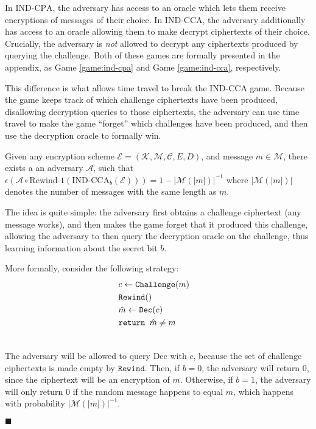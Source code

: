 In $\text{IND-CPA}$, the adversary has access to an oracle which lets them
receive encryptions of messages of their choice.
In $\text{IND-CCA}$, the adversary additionally has access to an oracle
allowing them to make decrypt ciphertexts of their choice.
Crucially, the adversary is \emph{not} allowed to decrypt any ciphertexts
produced by querying the challenge.
Both of these games are formally presented in the appendix, as
Game \ref{game:ind-cpa} and Game \ref{game:ind-cca}, respectively.

This difference is what allows time travel to break the
$\text{IND-CCA}$ game.
Because the game keeps track of which challenge ciphertexts have been produced,
disallowing decryption queries to those ciphertexts, the adversary
can use time travel to make the game ``forget'' which challenges have
been produced, and then use the decryption oracle to formally win.

\begin{claim}
\label{claim:ind-cca-broken}
Given any encryption scheme $\mathcal{E} = (\mathcal{K}, \mathcal{M}, \mathcal{C}, E, D)$, and message $m \in \mathcal{M}$, there exists a an adversary
$\mathcal{A}$, such that $\epsilon(\mathcal{A} \circ \text{Rewind-1}(\text{IND-CCA}_b(\mathcal{E}))) = 1 - |\mathcal{M}(|m|)|^{-1}$
where $|\mathcal{M}(|m|)|$ denotes the number of messages with the same length as $m$.
\end{claim}

The idea is quite simple: the adversary first obtains a challenge ciphertext (any message works),
and then makes the game forget that it produced this challenge, allowing the adversary
to then query the decryption oracle on the challenge, thus learning
information about the secret bit $b$.

More formally, consider the following strategy:
$$
\begin{aligned}
&c \gets \texttt{Challenge}(m)\cr
&\texttt{Rewind}()\cr
&\hat{m} \gets \texttt{Dec}(c)\cr
&\texttt{return } \hat{m} \neq m\cr
&
\end{aligned}
$$

The adversary will be allowed to query $\text{Dec}$ with $c$,
because the set of challenge ciphertexts is made empty by $\texttt{Rewind}$.
Then, if $b = 0$, the adversary will return $0$, since the ciphertext
will be an encryption of $m$.
Otherwise, if $b = 1$, the adversary will only return $0$ if the
random message happens to equal $m$, which happens with probability
$|\mathcal{M}(|m|)|^{-1}$.

$\blacksquare$


